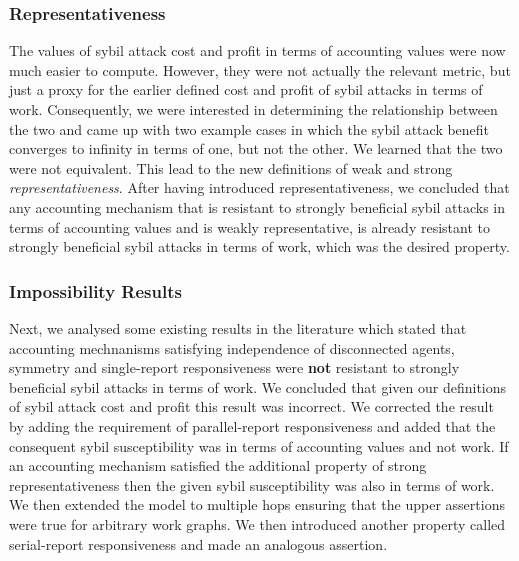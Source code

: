 \subsubsection*{Representativeness}
\label{subsubsec:Representativeness}
\noindent{}The values of sybil attack cost and profit in terms of accounting values were now much easier to compute. However, they were not actually the relevant metric, but just a proxy for the earlier defined cost and profit of sybil attacks in terms of work. Consequently, we were interested in determining the relationship between the two and came up with two example cases in which the sybil attack benefit converges to infinity in terms of one, but not the other. We learned that the two were not equivalent. This lead to the new definitions of weak and strong {\it representativeness}. After having introduced representativeness, we concluded that any accounting mechanism that is resistant to strongly beneficial sybil attacks in terms of accounting values and is weakly representative, is already resistant to strongly beneficial sybil attacks in terms of work, which was the desired property. \vspace{1em}\\



\subsubsection*{Impossibility Results}
\label{subsubsec:Impossibility Results}
\noindent{}Next, we analysed some existing results in the literature which stated that accounting mechnanisms satisfying independence of disconnected agents, symmetry and single-report responsiveness were \textbf{not} resistant to strongly beneficial sybil attacks in terms of work. We concluded that given our definitions of sybil attack cost and profit this result was incorrect. We corrected the result by adding the requirement of parallel-report responsiveness and added that the consequent sybil susceptibility was in terms of accounting values and not work. If an accounting mechanism satisfied the additional property of strong representativeness then the given sybil susceptibility was also in terms of work. We then extended the model to multiple hops ensuring that the upper assertions were true for arbitrary work graphs. We then introduced another property called serial-report responsiveness and made an analogous assertion. \vspace{1em}\\



